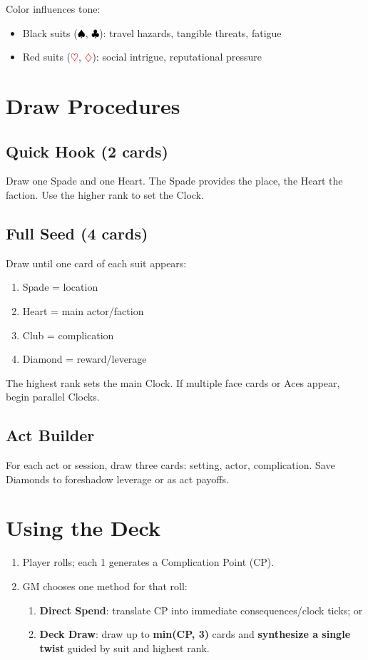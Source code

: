 Color influences tone:
\begin{itemize}
\item Black suits (\textcolor{black}{$\spadesuit$}, \textcolor{black}{$\clubsuit$}): travel hazards, tangible threats, fatigue
\item Red suits (\textcolor{red}{$\heartsuit$}, \textcolor{red}{$\diamondsuit$}): social intrigue, reputational pressure
\end{itemize}

\section{Draw Procedures}

\subsection{Quick Hook (2 cards)}
Draw one Spade and one Heart. The Spade provides the place, the Heart the faction. Use the higher rank to set the Clock.

\subsection{Full Seed (4 cards)}
Draw until one card of each suit appears:
\begin{enumerate}
\item Spade = location
\item Heart = main actor/faction
\item Club = complication
\item Diamond = reward/leverage
\end{enumerate}

The highest rank sets the main Clock. If multiple face cards or Aces appear, begin parallel Clocks.

\subsection{Act Builder}
For each act or session, draw three cards: setting, actor, complication. Save Diamonds to foreshadow leverage or as act payoffs.

\section{Using the Deck}

\begin{enumerate}
  \item Player rolls; each 1 generates a Complication Point (CP).
  \item GM chooses one method for that roll:
  \begin{enumerate}
    \item \textbf{Direct Spend}: translate CP into immediate consequences/clock ticks; or
    \item \textbf{Deck Draw}: draw up to \textbf{min(CP, 3)} cards and \textbf{synthesize a single twist}
    guided by suit and highest rank.
  \end{enumerate}
\end{enumerate}


